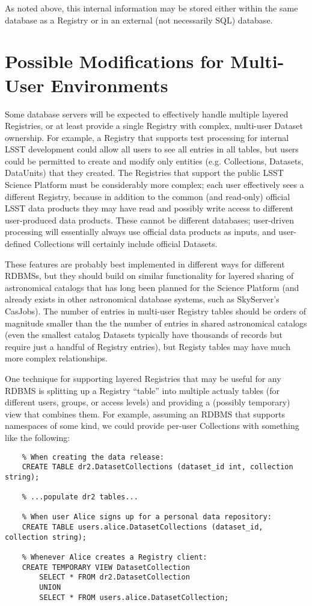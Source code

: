 \documentclass[DM,toc]{lsstdoc}
\begin{document}
As noted above, this internal information may be stored either within the same database as a Registry or in an external (not necessarily SQL) database.

\appendix

\section{Possible Modifications for Multi-User Environments}
\label{sec:multi-user-environments}

Some database servers will be expected to effectively handle multiple layered Registries, or at least provide a single Registry with complex, multi-user Dataset ownership.
For example, a Registry that supports test processing for internal LSST development could allow all users to see all entries in all tables, but users could be permitted to create and modify only entities (e.g. Collections, Datasets, DataUnits) that they created.
The Registries that support the public LSST Science Platform must be considerably more complex; each user effectively sees a different Registry, because in addition to the common (and read-only) official LSST data products they may have read and possibly write access to different user-produced data products.
These cannot be different databases; user-driven processing will essentially always use official data products as inputs, and user-defined Collections will certainly include official Datasets.

These features are probably best implemented in different ways for different RDBMSs, but they should build on similar functionality for layered sharing of astronomical catalogs that has long been planned for the Science Platform (and already exists in other astronomical database systems, such as SkyServer's CasJobs).
The number of entries in multi-user Registry tables should be orders of magnitude smaller than the the number of entries in shared astronomical catalogs (even the smallest catalog Datasets typically have thousands of records but require just a handful of Registry entries), but Registy tables may have much more complex relationships.

One technique for supporting layered Registries that may be useful for any RDBMS is splitting up a Registry ``table'' into multiple actualy tables (for different users, groups, or access levels) and providing a (possibly temporary) view that combines them.
For example, assuming an RDBMS that supports namespaces of some kind, we could provide per-user Collections with something like the following:
\begin{verbatim}
    % When creating the data release:
    CREATE TABLE dr2.DatasetCollections (dataset_id int, collection string);

    % ...populate dr2 tables...

    % When user Alice signs up for a personal data repository:
    CREATE TABLE users.alice.DatasetCollections (dataset_id, collection string);

    % Whenever Alice creates a Registry client:
    CREATE TEMPORARY VIEW DatasetCollection
        SELECT * FROM dr2.DatasetCollection
        UNION
        SELECT * FROM users.alice.DatasetCollection;
\end{verbatim}
\end{document}
